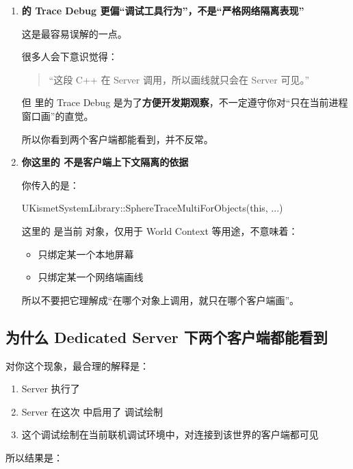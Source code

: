 \begin{enumerate}
	\item \textbf{  的 Trace Debug 更偏“调试工具行为”，不是“严格网络隔离表现”}
	
	这是最容易误解的一点。
	
	很多人会下意识觉得：
	
	\begin{quote}
		“这段 C++ 在 Server 调用，所以画线就只会在 Server 可见。”
	\end{quote}
	
	但  里的 Trace Debug 是为了\textbf{方便开发期观察}，不一定遵守你对“只在当前进程窗口画”的直觉。
	
	所以你看到两个客户端都能看到，并不反常。
	
	\item \textbf {你这里的  不是客户端上下文隔离的依据}
	
	你传入的是：
	
	\begin{code}
		UKismetSystemLibrary::SphereTraceMultiForObjects(this, ...)
	\end{code}
	
	这里的  是当前  对象，仅用于 World Context 等用途，不意味着：
	
	\begin{itemize}
		\item 只绑定某一个本地屏幕
		\item 只绑定某一个网络端画线
	\end{itemize}
	
	所以不要把它理解成“在哪个对象上调用，就只在哪个客户端画”。
\end{enumerate}
\subsection{为什么 Dedicated Server 下两个客户端都能看到}

对你这个现象，最合理的解释是：

\begin{enumerate}
	\item Server 执行了 
	\item Server 在这次  中启用了  调试绘制
	\item 这个调试绘制在当前联机调试环境中，对连接到该世界的客户端都可见
\end{enumerate}

所以结果是：

